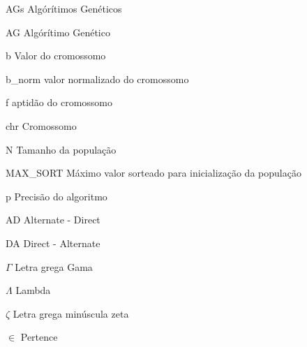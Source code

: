 \documentclass[
    12pt,               %
    oneside,%
    a4paper,            %
    english,            %
    french,             %
    spanish,            %
    brazil,             %
    ]{abntex2}
\begin{document}
\frenchspacing 


\imprimircapa

\imprimirfolhaderosto


\listoffigures*
\cleardoublepage

\listoftables*
\cleardoublepage

\begin{siglas}
  \item[AGs] Algórítimos Genéticos
  \item[AG] Algórítimo Genético
  \item[b] Valor do cromossomo
  \item[b\_norm] valor normalizado do cromossomo
  \item[f] aptidão do cromossomo  
  \item[chr] Cromossomo
  \item[N] Tamanho da população
  \item[MAX\_SORT] Máximo valor sorteado para inicialização da população 
  \item[p] Precisão do algoritmo 
  \item[AD] Alternate - Direct
  \item[DA] Direct - Alternate


\end{siglas}

\begin{simbolos}
  \item[$ \Gamma $] Letra grega Gama
  \item[$ \Lambda $] Lambda
  \item[$ \zeta $] Letra grega minúscula zeta
  \item[$ \in $] Pertence
\end{simbolos}
\end{document}

